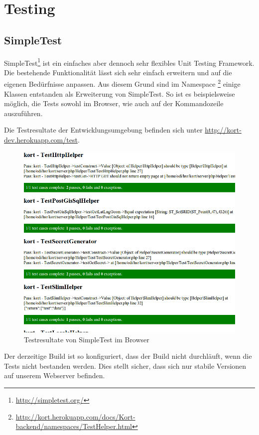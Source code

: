 \section{Testing}

\subsection{SimpleTest}
SimpleTest\footnote{\url{http://simpletest.org/}} ist ein einfaches aber dennoch sehr flexibles Unit Testing Framework.
Die bestehende Funktionalität lässt sich sehr einfach erweitern und auf die eigenen Bedürfnisse anpassen.
Aus diesem Grund sind im Namespace \footnote{\url{http://kort.herokuapp.com/docs/Kort-backend/namespaces/TestHelper.html}} einige Klassen entstanden als Erweiterung von SimpleTest.
So ist es beispielsweise möglich, die Tests sowohl im Browser, wie auch auf der Kommandozeile auszuführen.

Die Testresultate der Entwicklungsumgebung befinden sich unter \url{http://kort-dev.herokuapp.com/test}.

\begin{figure}[H]
	\centering
	\includegraphics[scale=0.5]{images/implementation/backend/simple-test}
	\caption{Testresultate von SimpleTest im Browser}
	\label{image-simple-test}
\end{figure}

Der derzeitige Build ist so konfiguriert, dass der Build nicht durchläuft, wenn die Tests nicht bestanden werden.
Dies stellt sicher, dass sich nur stabile Versionen auf unserem Webserver befinden.

